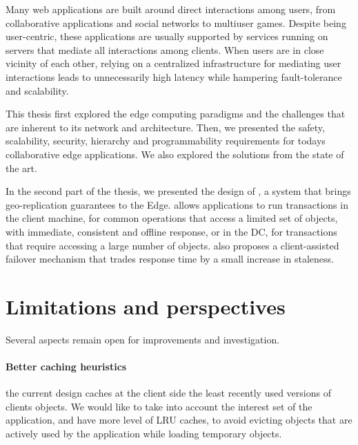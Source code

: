 %

Many web applications are built around direct interactions among users, 
from collaborative applications and social networks to multiuser games. 
Despite being user-centric, 
these applications are usually supported by services running on servers that 
mediate all interactions among clients. 
When users are in close vicinity of each other, 
relying on a centralized infrastructure for mediating user interactions 
leads to unnecessarily high latency while hampering fault-tolerance and scalability.

This thesis first explored the edge computing paradigms and the challenges 
that are inherent to its network and architecture.
Then, we presented the safety, scalability, security, hierarchy and programmability
requirements for todays collaborative edge applications.
We also explored the solutions from the state of the art.

In the second part of the thesis, 
we presented the design of \system{}, a system that brings
geo-replication guarantees to the Edge.
\system{} allows applications to run transactions in the client machine,
for common operations that access a limited set of objects, with
immediate, consistent and offline response, or in the DC, for
transactions that require accessing a large number of objects.
\system{} also proposes a client-assisted failover mechanism that trades
response time by a small increase in staleness.

\section{Limitations and perspectives}

Several aspects remain open for improvements and investigation.

\paragraph{Better caching heuristics} 
the current design caches at the client side the least recently used versions
of clients objects.
We would like to take into account the interest set of the application,
and have more level of LRU caches,
to avoid evicting objects that are actively used by the application
while loading temporary objects.

